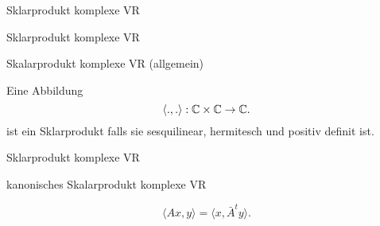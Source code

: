 \documentclass[class=article, crop=false]{standalone}
\begin{document}
\begin{zettel}{Sklarprodukt komplexe VR}
\begin{flashcard}[j3oj7wsi]{Sklarprodukt komplexe VR}
	\begin{question}
		Skalarprodukt komplexe VR (allgemein)
	\end{question}
	\begin{definition}
		Eine Abbildung
		\[
			\langle .,.\rangle : \mathbb{C} \times \mathbb{C} \to \mathbb{C}
		.\]
		ist ein Sklarprodukt falls sie sesquilinear, hermitesch und positiv definit ist.
	\end{definition}
\end{flashcard}

\begin{flashcard}{Sklarprodukt komplexe VR}
	\begin{question}
		kanonisches Skalarprodukt komplexe VR
	\end{question}
\end{flashcard}
\begin{remark}
	\[
		\langle Ax,y \rangle = \langle x,\bar{A}^{t}y\rangle
	.\]
\end{remark}
\end{zettel}
\end{document}
